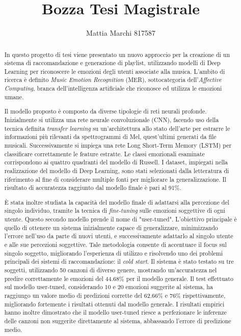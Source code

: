 \documentclass[11pt]{report}
\makeatletter
\newcommand\frontmatter{%
    \cleardoublepage
  \pagenumbering{Roman}}
\makeatother
\begin{document}
\frontmatter

\title{Bozza Tesi Magistrale}

\author{Mattia Marchi 817587 }

\date{}

\maketitle



\newpage

\begin{abstract}
In questo progetto di tesi viene presentato un nuovo approccio per la creazione di un sistema di raccomandazione e generazione di playlist, utilizzando modelli di Deep Learning per riconoscere le emozioni degli utenti associate alla musica. L'ambito di ricerca è definito\textit{ Music Emotion Recognition }(MER), sottocategoria dell’\textit{Affective Computing}, branca dell’intelligenza artificiale che riconosce ed utilizza le emozioni umane.


Il modello proposto è composto da diverse tipologie di reti neurali profonde. Inizialmente si utilizza una rete neurale convoluzionale (CNN), facendo uso della tecnica definita \textit{transfer learning} su un’architettura allo stato dell'arte per estrarre le informazioni più rilevanti da spettrogrammi di Mel, quest’ultimi generati da file musicali. Successivamente si impiega una rete Long Short-Term Memory (LSTM) per classificare correttamente le feature estratte. Le classi emozionali esaminate corrispondono ai quattro quadranti del modello di Russell. I dataset, impiegati nella realizzazione del modello di Deep Learning, sono stati selezionati dalla letteratura di riferimento al fine di considerare multiple fonti per migliorare la generalizzazione. Il risultato di accuratezza raggiunto dal modello finale è pari al 91\%.  


È stata inoltre studiata la capacità del modello finale di adattarsi alla percezione del singolo individuo, tramite la tecnica di \textit{fine-tuning} sulle emozioni soggettive di ogni utente. Questo secondo modello prende il nome di "user-tuned". L'obiettivo principale è quello di ottenere un sistema inizialmente capace di generalizzare, minimizzando l'errore nell’uso da parte di nuovi utenti, e successivamente adattarlo al singolo utente e alle sue percezioni soggettive. Tale metodologia consente di accentuare il focus sul singolo soggetto, migliorando l'esperienza di utilizzo e risolvendo uno dei problemi principali dei sistemi di raccomandazione: il \textit{cold start}. Il sistema è stato testato su tre soggetti, utilizzando 50 canzoni di diverso genere, mostrando un'accuratezza nel predire correttamente le emozioni del 44.68\% per il modello generale. Il test effettuato sul modello user-tuned, considerando 10 e 20 emozioni suggerite al sistema, ha raggiungo un valore medio di predizioni corrette del 62.66\% e 76\% rispettivamente, migliorando fortemente i risultati ottenuti dal modello generale. I risultati empirici hanno inoltre dimostrato che il modello user-tuned riesce a perfezionare le inferenze delle canzoni non suggerite direttamente al sistema, abbassando l'errore di predizione medio.



\end{abstract}
\end{document}
